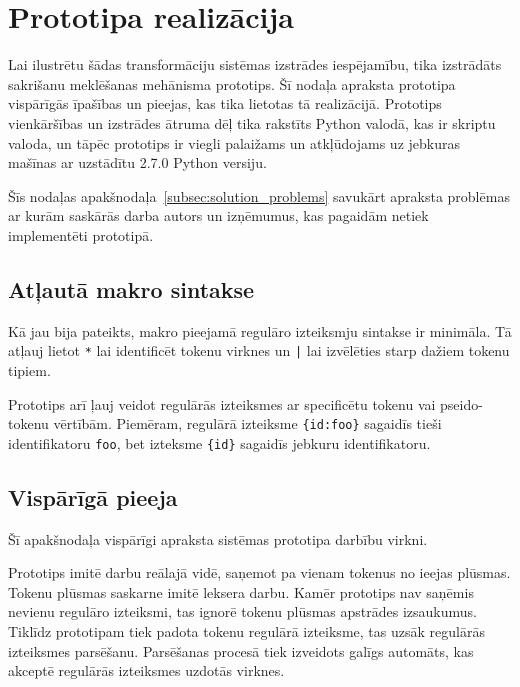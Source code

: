 \section{Prototipa realizācija}


Lai ilustrētu šādas transformāciju sistēmas izstrādes iespējamību, tika izstrādāts sakrišanu meklēšanas mehānisma prototips. Šī nodaļa apraksta prototipa vispārīgās īpašības un pieejas, kas tika lietotas tā realizācijā. Prototips vienkāršības un izstrādes ātruma dēļ tika rakstīts Python valodā, kas ir skriptu valoda, un tāpēc prototips ir viegli palaižams un atkļūdojams uz jebkuras mašīnas ar uzstādītu 2.7.0 Python versiju.

Šīs nodaļas apakšnodaļa~\ref{subsec:solution_problems} savukārt apraksta problēmas ar kurām saskārās darba autors un izņēmumus, kas pagaidām netiek implementēti prototipā.


\subsection{\label{subsec:solution_syntax}Atļautā makro sintakse}

Kā jau bija pateikts, makro pieejamā regulāro izteiksmju sintakse ir minimāla. Tā atļauj lietot \verb|*| lai identificēt tokenu virknes un \verb/|/ lai izvēlēties starp dažiem tokenu tipiem.

Prototips arī ļauj veidot regulārās izteiksmes ar specificētu tokenu vai pseido-tokenu vērtībām. Piemēram, regulārā izteiksme \verb|{id:foo}| sagaidīs tieši identifikatoru \verb|foo|, bet izteksme \verb|{id}| sagaidīs jebkuru identifikatoru.

\subsection{\label{subsec:solution_approach}Vispārīgā pieeja}
Šī apakšnodaļa vispārīgi apraksta sistēmas prototipa darbību virkni.

Prototips imitē darbu reālajā vidē, saņemot pa vienam tokenus no ieejas plūsmas. Tokenu plūsmas saskarne imitē leksera darbu. Kamēr prototips nav saņēmis nevienu regulāro izteiksmi, tas ignorē tokenu plūsmas apstrādes izsaukumus. Tiklīdz prototipam tiek padota tokenu regulārā izteiksme, tas uzsāk regulārās izteiksmes parsēšanu. Parsēšanas procesā tiek izveidots galīgs automāts, kas akceptē regulārās izteiksmes uzdotās virknes.

